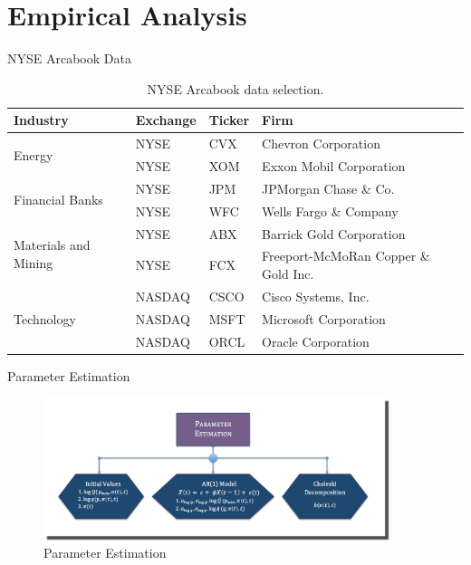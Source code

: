 \documentclass{beamer}
\begin{document}
\section{Empirical Analysis}
\begin{frame}[shrink=35]{{\color{cyan}NYSE Arcabook Data}}
\bigskip
\begin{table}[H]
\begin{center}
\begin{tabular}{llll}
\hline
\textbf{Industry} & \textbf{Exchange} & \textbf{Ticker} & \textbf{Firm}\\
\hline \hline

\multirow{2}{*}{Energy} & NYSE & CVX & Chevron Corporation\\
 & NYSE & XOM & Exxon Mobil Corporation\\

\hline
\multirow{2}{*}{Financial Banks} & NYSE & JPM & JPMorgan Chase \& Co.\\
 & NYSE & WFC & Wells Fargo \& Company \\

 \hline
 \multirow{2}{*}{Materials and Mining} & NYSE & ABX & Barrick Gold Corporation \\
 & NYSE & FCX & Freeport-McMoRan Copper \& Gold Inc. \\

 \hline
 \multirow{3}{*}{Technology} & NASDAQ & CSCO & Cisco Systems, Inc. \\
 & NASDAQ & MSFT & Microsoft Corporation \\
 & NASDAQ & ORCL & Oracle Corporation \\
\hline
\end{tabular}
\end{center}
\caption{NYSE Arcabook data selection.}
\label{table:NYSE_Arcabook_Selection}
\end{table}

\end{frame}

\begin{frame}[shrink=35]{{\color{cyan}Parameter Estimation}}
\bigskip
\begin{figure}[htbp]
                \centering
                \includegraphics[width=0.9\textwidth]{Parameter_Estimation.png}
                \caption{Parameter Estimation}
                \label{fig:parameter_estimation}
\end{figure}

\end{frame}
\end{document}
